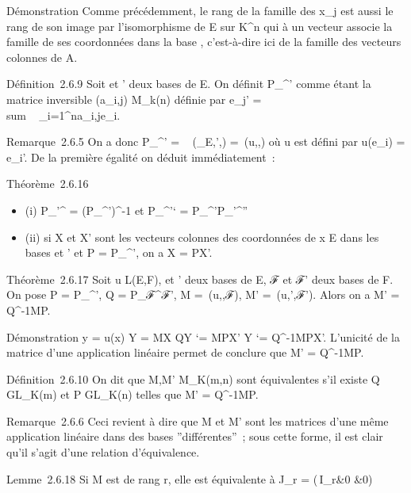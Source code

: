 \documentclass[]{article}
\begin{document}
Démonstration Comme précédemment, le rang de la famille des x_j
est aussi le rang de son image par l'isomorphisme de E sur
K^n qui à un vecteur associe la famille de ses coordonnées
dans la base , c'est-à-dire ici de la famille des vecteurs colonnes de
A.

Définition~2.6.9 Soit  et ' deux bases de E. On définit
P_^' comme étant la matrice inversible
(a_i,j) \in M_k(n) définie par e_j'
= \\sum ~
_i=1^na_i,je_i.

Remarque~2.6.5 On a donc P_^'
= \mathrmMat~
(\mathrmId_E,',) =\
\mathrmMat (u,,) où u est défini par
u(e_i) = e_i'. De la première égalité on déduit
immédiatement~:

Théorème~2.6.16

\begin{itemize}
\itemsep1pt\parskip0pt
\item
  (i) P_'^ = (P_^')^-1 et
  P_^'` =
  P_^'P_\mathcal{E}'^''
\item
  (ii) si X et X' sont les vecteurs colonnes des coordonnées de x \in E
  dans les bases  et ' et P = P_\mathcal{E}^\mathcal{E}', on a X = PX'.
\end{itemize}

Théorème~2.6.17 Soit u \in L(E,F),  et ' deux bases de E, ℱ et ℱ' deux
bases de F. On pose P = P_^\mathcal{E}', Q =
P_ℱ^ℱ', M =\
\mathrmMat (u,\mathcal{E},ℱ), M' =\
\mathrmMat (u,',ℱ'). Alors on a M' =
Q^-1MP.

Démonstration y = u(x) \Leftrightarrow Y = MX
\Leftrightarrow QY `= MPX' \mathrel\Leftrightarrow Y
`= Q^-1MPX'. L'unicité de la matrice d'une application
linéaire permet de conclure que M' = Q^-1MP.

Définition~2.6.10 On dit que M,M' \in M_K(m,n) sont équivalentes
s'il existe Q \in GL_K(m) et P \in GL_K(n) telles que M' =
Q^-1MP.

Remarque~2.6.6 Ceci revient à dire que M et M' sont les matrices d'une
même application linéaire dans des bases ''différentes''~; sous cette
forme, il est clair qu'il s'agit d'une relation d'équivalence.

Lemme~2.6.18 Si M est de rang r, elle est équivalente à J_r =
\left
(\matrix\,I_r&0
\cr 0 &0\right )
\end{document}

